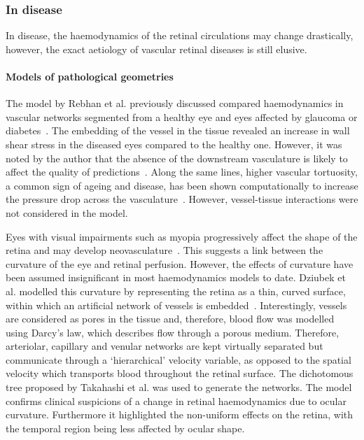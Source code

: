 \documentclass{article}
\begin{document}
\subsubsection{In disease}

In disease, the haemodynamics of the retinal circulations may change drastically, however, the exact aetiology of vascular retinal diseases is still elusive.

\paragraph*{Models of pathological geometries}

The model by Rebhan et al. previously discussed compared haemodynamics in vascular networks segmented from a healthy eye and eyes affected by glaucoma or diabetes~\cite{Rebhan_2019}.
The embedding of the vessel in the tissue revealed an increase in wall shear stress in the diseased eyes compared to the healthy one.
However, it was noted by the author that the absence of the downstream vasculature is likely to affect the quality of predictions~\cite{Rebhan_2019}.
Along the same lines, higher vascular tortuosity, a common sign of ageing and disease, has been shown computationally to increase the pressure drop across the vasculature~\cite{Malek_2014}.
However, vessel-tissue interactions were not considered in the model.

Eyes with visual impairments such as myopia progressively affect the shape of the retina and may develop neovasculature~\cite{Medina_2016}.
This suggests a link between the curvature of the eye and retinal perfusion.
However, the effects of curvature have been assumed insignificant in most haemodynamics models to date.
Dziubek et al. modelled this curvature by representing the retina as a thin, curved surface, within which an artificial network of vessels is embedded~\cite{Dziubek_2015}.
Interestingly, vessels are considered as pores in the tissue and, therefore, blood flow was modelled using Darcy's law, which describes flow through a porous medium.
Therefore, arteriolar, capillary and venular networks are kept virtually separated but communicate through a `hierarchical' velocity variable, as opposed to the spatial velocity which transports blood throughout the retinal surface.
The dichotomous tree proposed by Takahashi et al. was used to generate the networks.
The model confirms clinical suspicions of a change in retinal haemodynamics due to ocular curvature.
Furthermore it highlighted the non-uniform effects on the retina, with the temporal region being less affected by ocular shape\cite{Dziubek_2015}.
\end{document}
